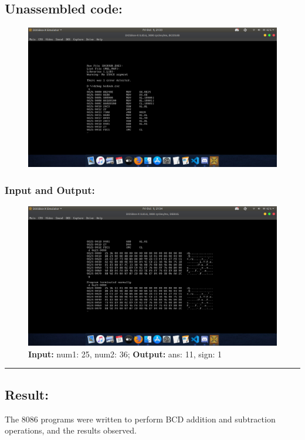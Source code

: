 \documentclass[10pt,a4paper]{article}
\begin{document}
\begin{flushleft}
\newpage
\subsection*{\textbf{Unassembled code:}}
\begin{figure}[h]
    \centering
    \includegraphics[trim = 100mm 60mm 200mm 120mm, clip, width = \textwidth]{Pics/BSUS.png}
\end{figure}
\subsubsection*{\textbf{Input and Output:}}
\begin{figure}[h]
    \centering
    \includegraphics[trim = 100mm 60mm 100mm 80mm, clip, width = \textwidth]{Pics/BSIO.png}
    \caption{ \textbf{Input:} num1: 25, num2: 36; \newline \hspace{1cm}
              \textbf{Output:} ans: 11, sign: 1}
\end{figure}
\hrule
\subsection*{\textbf{Result:}}
The 8086 programs were written to perform BCD addition and subtraction operations, and the results observed.
\end{flushleft}
\end{document}
